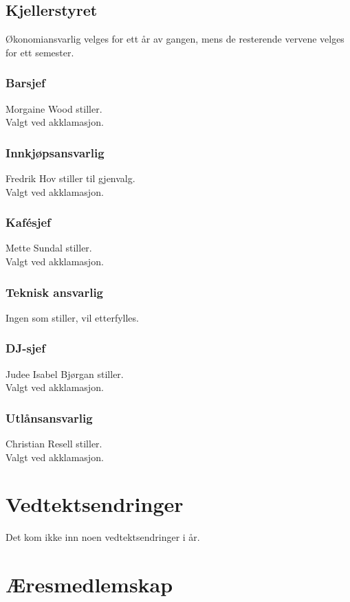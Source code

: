 \documentclass[10pt,norsk,a4paper]{article}
\begin{document}
\begin{minipage}[t]{9cm}
\subsection{Kjellerstyret}
Økonomiansvarlig velges for ett år av gangen, mens de resterende vervene velges for ett semester.
\subsubsection{Barsjef}
Morgaine Wood stiller.\\
Valgt ved akklamasjon.
\subsubsection{Innkjøpsansvarlig}
Fredrik Hov stiller til gjenvalg.\\
Valgt ved akklamasjon.
\subsubsection{Kafésjef}
Mette Sundal stiller.\\
Valgt ved akklamasjon.
\subsubsection{Teknisk ansvarlig}
Ingen som stiller, vil etterfylles.
\subsubsection{DJ-sjef}
Judee Isabel Bjørgan stiller.\\
Valgt ved akklamasjon.
\subsubsection{Utlånsansvarlig}
Christian Resell stiller.\\
Valgt ved akklamasjon.
\end{minipage}


\section{Vedtektsendringer}
Det kom ikke inn noen vedtektsendringer i år.

\section{Æresmedlemskap}
\end{document}
